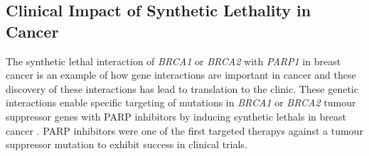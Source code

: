 \subsection{Clinical Impact of Synthetic Lethality in Cancer}
\label{SL_Clinical}


The \gls{synthetic lethal} interaction of \textit{BRCA1} or \textit{BRCA2} with \textit{PARP1} in breast cancer is an example of how gene interactions are important in cancer and these discovery of these interactions has lead to translation to the clinic. These genetic interactions enable specific targeting of \glspl{mutation} in \textit{BRCA1} or \textit{BRCA2} \gls{tumour suppressor} genes with PARP inhibitors by inducing \glspl{synthetic lethal} in breast cancer \citep{Farmer2005}. PARP inhibitors were one of the first \glspl{targeted therapy} against a \gls{tumour suppressor} \gls{mutation} to exhibit success in clinical trials. 

